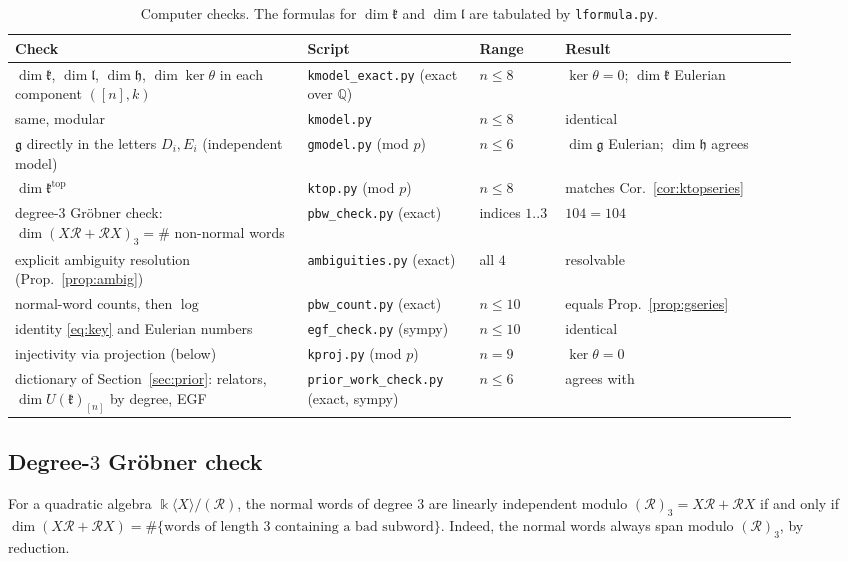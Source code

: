 \documentclass[11pt]{amsart}
\theoremstyle{definition}
\theoremstyle{remark}
\newcommand{\Q}{\mathbb{Q}}
\newcommand{\kk}{\Bbbk}
\newcommand{\g}{\mathfrak{g}}
\newcommand{\h}{\mathfrak{h}}
\newcommand{\lie}{\mathfrak{l}}
\newcommand{\kr}{\mathfrak{k}}
\newcommand{\ktop}{\mathfrak{k}^{\mathrm{top}}}
\begin{document}
\begin{table}[ht]
\centering
\small
\begin{tabular}{@{}>{\raggedright\arraybackslash}p{0.34\linewidth}>{\raggedright\arraybackslash}p{0.2\linewidth}>{\raggedright\arraybackslash}p{0.1\linewidth}>{\raggedright\arraybackslash}p{0.27\linewidth}@{}}
\toprule
Check & Script & Range & Result\\
\midrule
$\dim\kr$, $\dim\lie$, $\dim\h$, $\dim\ker\theta$ in each component $([n],k)$ & \texttt{kmodel\_exact.py} (exact over $\Q$) & $n\le8$ & $\ker\theta=0$; $\dim\kr$ Eulerian\\
same, modular & \texttt{kmodel.py} & $n\le8$ & identical\\
$\g$ directly in the letters $D_i,E_i$ (independent model) & \texttt{gmodel.py} (mod $p$) & $n\le6$ & $\dim\g$ Eulerian; $\dim\h$ agrees\\
$\dim\ktop$ & \texttt{ktop.py} (mod $p$) & $n\le8$ & matches Cor.~\ref{cor:ktopseries}\\
degree-$3$ Gr\"obner check: $\dim(X\mathcal R+\mathcal RX)_3=\#$ non-normal words & \texttt{pbw\_check.py} (exact) & indices $1..3$ & $104=104$\\
explicit ambiguity resolution (Prop.~\ref{prop:ambig}) & \texttt{ambiguities.py} (exact) & all $4$ & resolvable\\
normal-word counts, then $\log$ & \texttt{pbw\_count.py} (exact) & $n\le10$ & equals Prop.~\ref{prop:gseries}\\
identity \eqref{eq:key} and Eulerian numbers & \texttt{egf\_check.py} (sympy) & $n\le10$ & identical\\
injectivity via projection (below) & \texttt{kproj.py} (mod $p$) & $n=9$ & $\ker\theta=0$\\
dictionary of Section~\ref{sec:prior}: relators, $\dim U(\kr)_{[n]}$ by degree, EGF & \texttt{prior\_work\_}\allowbreak\texttt{check.py} (exact, sympy) & $n\le6$ & agrees with \cite{LM,DST}\\
\bottomrule
\end{tabular}
\caption{Computer checks. The formulas for $\dim\kr$ and $\dim\lie$ are tabulated by \texttt{lformula.py}.}
\label{tab:checks}
\end{table}

\subsection*{Degree-$3$ Gr\"obner check}
For a quadratic algebra $\kk\langle X\rangle/(\mathcal R)$, the normal words of degree $3$ are linearly independent modulo $(\mathcal R)_3=X\mathcal R+\mathcal RX$ if and only if $\dim(X\mathcal R+\mathcal RX)=\#\{\text{words of length }3\text{ containing a bad subword}\}$. Indeed, the normal words always span modulo $(\mathcal R)_3$, by reduction.
\end{document}
